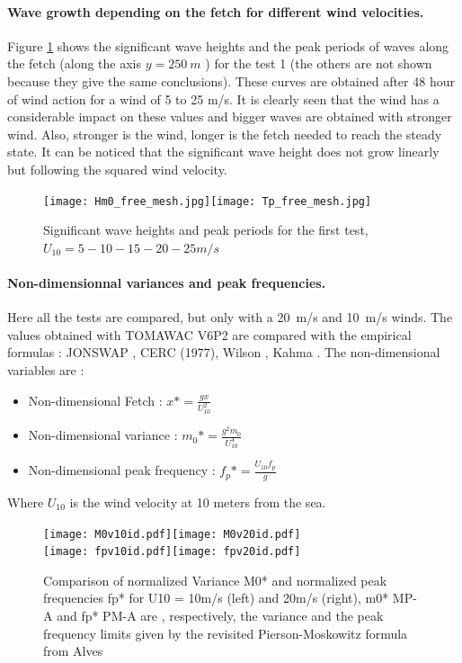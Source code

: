 \paragraph{Wave growth depending on the fetch for different wind velocities.}
Figure \ref{hsfet} shows the significant wave heights and the peak periods of waves along the fetch (along the axis $ y = 250~m$ ) for the test 1 (the others are not shown because they give the same conclusions). These curves are obtained after 48 hour of wind action for a wind of 5 to 25 m/s. It is clearly seen that the wind has a considerable impact on these values and bigger waves are obtained with stronger wind. Also, stronger is the wind, longer is the fetch needed to reach the steady state. It can be noticed that the significant wave height does not grow linearly but following the squared wind velocity.
\begin{figure}[H]
  \centering
  	\texttt{[image: Hm0\_free\_mesh.jpg]}\texttt{[image: Tp\_free\_mesh.jpg]}
      \caption{Significant wave heights and peak periods for the first test, $U_{10} = 5 - 10 - 15 - 20 - 25 m/s$}
\label{hsfet}
\end{figure}
\paragraph{Non-dimensionnal variances and peak frequencies.}
Here all the tests are compared, but only with a 20~m/s and 10~m/s winds. The values obtained with TOMAWAC V6P2 are compared with the empirical formulas : JONSWAP \cite{Hasselmann1973}, CERC (1977)\cite {CERC77}, Wilson \cite{Wilson1965}, Kahma \cite{Kahma1992}. The non-dimensional variables are :\\
\begin{itemize}
\item Non-dimensional Fetch : $x* = \frac{g x}{U_{10}^2}$
\item Non-dimensional variance : $m_{0}* = \frac{g^2 m_{0}}{U_{10}^4}$
\item Non-dimensional peak frequency : $f_{p}* = \frac{U_{10} f_{p}}{g}$
\end{itemize}
Where $U_{10}$ is the wind velocity at 10 meters from the sea.\\
\begin{figure}[H]
  \centering
  	\texttt{[image: M0v10id.pdf]}\texttt{[image: M0v20id.pdf]}\\
  	\texttt{[image: fpv10id.pdf]}\texttt{[image: fpv20id.pdf]}\\
      \caption{Comparison of normalized Variance M0* and normalized peak frequencies fp* for U10 = 10m/s (left) and 20m/s (right), m0* MP-A and fp* PM-A are , respectively, the variance and the peak frequency limits given by the revisited Pierson-Moskowitz formula from Alves \cite{Alves2003}}
\label{variancefet}
\end{figure}

